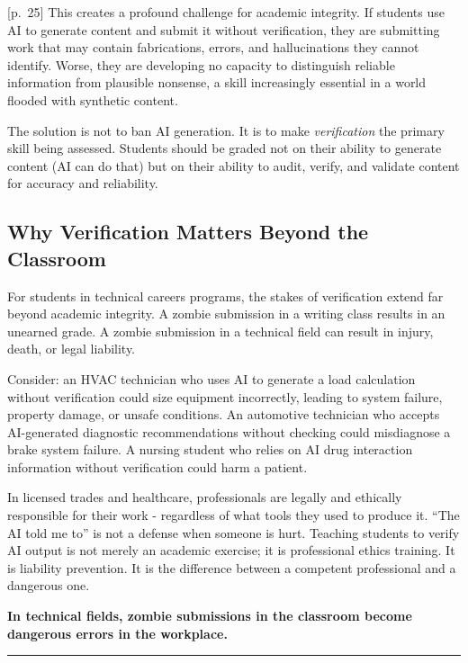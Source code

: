 \documentclass[
  letterpaper,
  DIV=11,
  numbers=noendperiod]{scrreprt}
\begin{document}
{[}p.~25{]} This creates a profound challenge for academic integrity. If
students use AI to generate content and submit it without verification,
they are submitting work that may contain fabrications, errors, and
hallucinations they cannot identify. Worse, they are developing no
capacity to distinguish reliable information from plausible nonsense, a
skill increasingly essential in a world flooded with synthetic content.

The solution is not to ban AI generation. It is to make
\emph{verification} the primary skill being assessed. Students should be
graded not on their ability to generate content (AI can do that) but on
their ability to audit, verify, and validate content for accuracy and
reliability.

\subsection{Why Verification Matters Beyond the
Classroom}\label{why-verification-matters-beyond-the-classroom}

For students in technical careers programs, the stakes of verification
extend far beyond academic integrity. A zombie submission in a writing
class results in an unearned grade. A zombie submission in a technical
field can result in injury, death, or legal liability.

Consider: an HVAC technician who uses AI to generate a load calculation
without verification could size equipment incorrectly, leading to system
failure, property damage, or unsafe conditions. An automotive technician
who accepts AI-generated diagnostic recommendations without checking
could misdiagnose a brake system failure. A nursing student who relies
on AI drug interaction information without verification could harm a
patient.

In licensed trades and healthcare, professionals are legally and
ethically responsible for their work - regardless of what tools they
used to produce it. ``The AI told me to'' is not a defense when someone
is hurt. Teaching students to verify AI output is not merely an academic
exercise; it is professional ethics training. It is liability
prevention. It is the difference between a competent professional and a
dangerous one.

\textbf{In technical fields, zombie submissions in the classroom become
dangerous errors in the workplace.}

\begin{center}\rule{0.5\linewidth}{0.5pt}\end{center}
\end{document}
